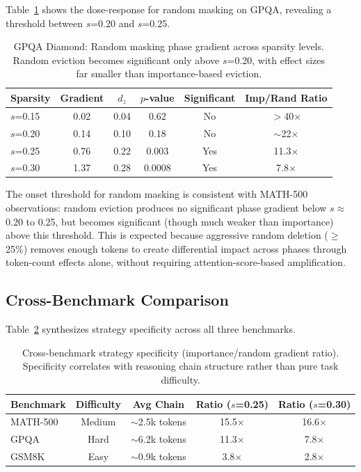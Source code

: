 \documentclass[11pt,a4paper]{article}
\begin{document}
Table~\ref{tab:gpqa_random} shows the dose-response for random masking on GPQA, revealing a threshold between $s$=0.20 and $s$=0.25.

\begin{table}[h]
\centering
\caption{GPQA Diamond: Random masking phase gradient across sparsity levels. Random eviction becomes significant only above $s$=0.20, with effect sizes far smaller than importance-based eviction.}
\label{tab:gpqa_random}
\begin{tabular}{lccccc}
\toprule
Sparsity & Gradient & $d_z$ & $p$-value & Significant & Imp/Rand Ratio \\
\midrule
$s$=0.15 & 0.02 & 0.04 & 0.62 & No & $>$40$\times$ \\
$s$=0.20 & 0.14 & 0.10 & 0.18 & No & $\sim$22$\times$ \\
$s$=0.25 & 0.76 & 0.22 & 0.003 & Yes & 11.3$\times$ \\
$s$=0.30 & 1.37 & 0.28 & 0.0008 & Yes & 7.8$\times$ \\
\bottomrule
\end{tabular}
\end{table}

The onset threshold for random masking is consistent with MATH-500 observations: random eviction produces no significant phase gradient below $s \approx$ 0.20 to 0.25, but becomes significant (though much weaker than importance) above this threshold. This is expected because aggressive random deletion ($\geq$25\%) removes enough tokens to create differential impact across phases through token-count effects alone, without requiring attention-score-based amplification.

\subsection{Cross-Benchmark Comparison}

Table~\ref{tab:cross_benchmark} synthesizes strategy specificity across all three benchmarks.

\begin{table}[h]
\centering
\caption{Cross-benchmark strategy specificity (importance/random gradient ratio). Specificity correlates with reasoning chain structure rather than pure task difficulty.}
\label{tab:cross_benchmark}
\begin{tabular}{lcccc}
\toprule
Benchmark & Difficulty & Avg Chain & Ratio ($s$=0.25) & Ratio ($s$=0.30) \\
\midrule
MATH-500 & Medium & $\sim$2.5k tokens & 15.5$\times$ & 16.6$\times$ \\
GPQA & Hard & $\sim$6.2k tokens & 11.3$\times$ & 7.8$\times$ \\
GSM8K & Easy & $\sim$0.9k tokens & 3.8$\times$ & 2.8$\times$ \\
\bottomrule
\end{tabular}
\end{table}
\end{document}
